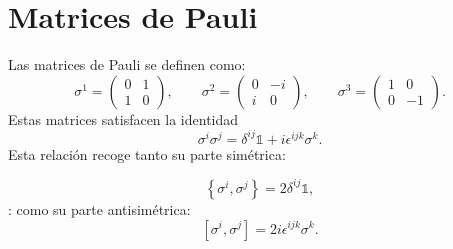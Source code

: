 \documentclass[a4paper,11pt]{book} %
\begin{document}
\section{Matrices de Pauli}
\noindent
Las matrices de Pauli se definen como:
\begin{equation}
    \sigma^1
    =
    \begin{pmatrix}
        0 & 1 \\
        1 & 0
    \end{pmatrix},
    \qquad
    \sigma^2
    =
    \begin{pmatrix}
        0 & -i \\
        i & 0
    \end{pmatrix},
    \qquad
    \sigma^3
    =
    \begin{pmatrix}
        1 & 0 \\
        0 & -1
    \end{pmatrix}.
\end{equation}
\noindent
Estas matrices satisfacen la identidad
\begin{equation}
    \sigma^i\sigma^j
    =
    \delta^{ij}\mathbb{1}
    +
    i\epsilon^{ijk}\sigma^k.
\end{equation}
\noindent
Esta relación recoge tanto su parte simétrica:

\begin{equation}
    \left\{
        \sigma^i,\sigma^j
    \right\}
    =
    2\delta^{ij}\mathbb{1},
\end{equation}
\noindent:
como su parte antisimétrica:
\begin{equation}
    \left[
        \sigma^i,\sigma^j
    \right]
    =
    2i\epsilon^{ijk}\sigma^k.
\end{equation}
\newpage
\end{document}
